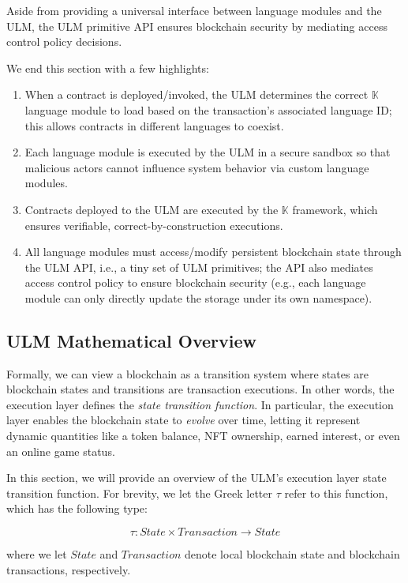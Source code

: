 \documentclass{article}
\newcommand{\ulm}{{ULM}}
\newcommand{\K}{\ensuremath{\mathbb{K}}}
\begin{document}
Aside from providing a universal interface between language modules and the \ulm{}, the \ulm{} primitive API ensures blockchain security by mediating access control policy decisions.

We end this section with a few highlights:
\begin{enumerate}
  \item When a contract is deployed/invoked, the \ulm{} determines the correct \K{} language module to load based on the transaction's associated language ID; this allows contracts in different languages to coexist.
  \item Each language module is executed by the \ulm{} in a secure sandbox so that malicious actors cannot influence system behavior via custom language modules.
  \item Contracts deployed to the \ulm{} are executed by the \K{} framework, which ensures verifiable, correct-by-construction executions.
  \item All language modules must access/modify persistent blockchain state through the \ulm{} API, i.e., a tiny set of \ulm{} primitives; the API also mediates access control policy to ensure blockchain security (e.g., each language module can only directly update the storage under its own namespace).
\end{enumerate}

\subsection{\ulm{} Mathematical Overview}

Formally, we can view a blockchain as a transition system where states are blockchain states and transitions are transaction executions.
In other words, the execution layer defines the \emph{state transition function}.
In particular, the execution layer enables the blockchain state to \emph{evolve} over time, letting it represent dynamic quantities like a token balance, NFT ownership, earned interest, or even an online game status.

In this section, we will provide an overview of the \ulm{}'s execution layer state transition function.
For brevity, we let the Greek letter $\tau$ refer to this function, which has the following type:

$$\tau : State \times Transaction \rightarrow State$$

\noindent where we let $State$ and $Transaction$ denote local blockchain state and blockchain transactions, respectively.
\end{document}
